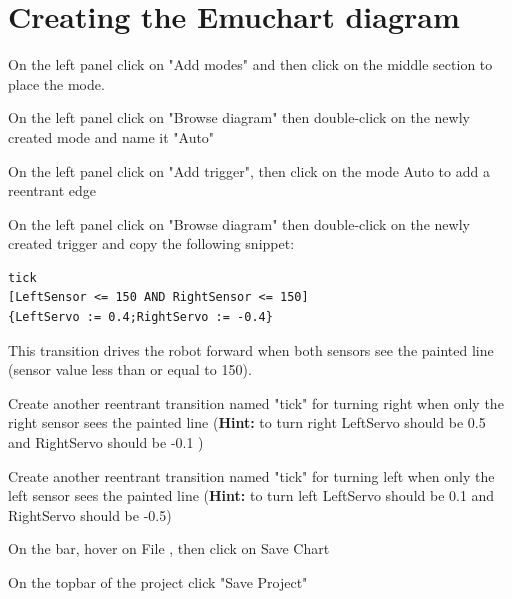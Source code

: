\documentclass[11pt,a4paper]{../tutorial}
\begin{document}
\section{Creating the Emuchart diagram}
\begin{instructions}
\item On the left panel click on "Add modes" and then click on the middle section to place the mode.
\item On the left panel click on "Browse diagram" then double-click on the newly created mode and name it "Auto"
\item On the left panel click on "Add trigger", then click on the mode Auto to add a reentrant edge
\item On the left panel click on "Browse diagram" then double-click on the newly created trigger and copy the following snippet:
\begin{verbatim}
tick
[LeftSensor <= 150 AND RightSensor <= 150]
{LeftServo := 0.4;RightServo := -0.4}
\end{verbatim}

This transition drives the robot forward when both sensors see the painted line (sensor value less than or equal to 150).
\item Create another reentrant transition named "tick" for turning right when only the right sensor sees the painted line (\textbf{Hint:} to turn right LeftServo should be 0.5 and RightServo should be -0.1 )
\item Create another reentrant transition named "tick" for turning left when only the left sensor sees the painted line (\textbf{Hint:} to turn left LeftServo should be 0.1 and RightServo should be -0.5)
\item \label{Save2} On the bar, hover on File , then click on Save Chart
\item On the topbar of the project click "Save Project"


\end{instructions}
\end{document}
